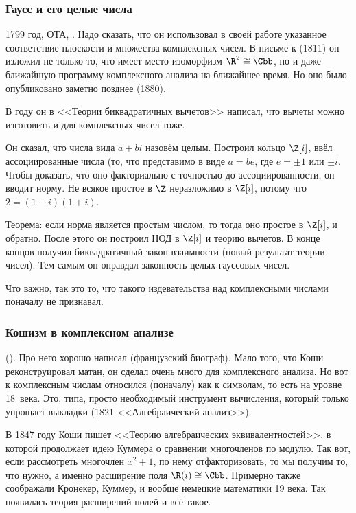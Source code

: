 \documentclass[a4paper,oneside,fleqn,10pt]{article}
\begin{document}
\subsubsection{Гаусс и его целые числа}

1799 год, ОТА, . Надо сказать, что он использовал в своей работе
указанное соответствие плоскости и множества комплексных чисел.
В письме к  (1811) он изложил не только то, что имеет
место изоморфизм $\R^2 \cong \Cbb$, но и даже ближайшую программу комплексного анализа
на ближайшее время. Но оно было опубликовано заметно позднее (1880).

В  году он в <<Теории биквадратичных вычетов>> написал, что вычеты
можно изготовить и для комплексных чисел тоже.

Он сказал, что числа вида $a+ bi$ назовём целым. Построил кольцо $\Z[i]$,
ввёл ассоциированные числа (то, что представимо в виде $a = be$, где $e = \pm1$ или $\pm i$.
Чтобы доказать, что оно факториально с точностью до ассоциированности, он вводит норму.
Не всякое простое в $\Z$ неразложимо в $\Z[i]$, потому что $2 = (1-i)(1+i)$.

Теорема: если норма является простым числом, то тогда оно простое в $\Z[i]$, и обратно.
После этого он построил НОД в $\Z[i]$ и теорию вычетов. В конце концов получил
биквадратичный закон взаимности (новый результат теории чисел).
Тем самым он оправдал законность целых гауссовых чисел.

Что важно, так это то, что  такого издевательства над комплексными
числами поначалу не признавал.

\subsubsection{Кошизм в комплексном анализе}

 ().
Про него  хорошо написал  (французский биограф).
Мало того, что Коши реконструировал матан, он сделал очень много
для комплексного анализа. Но вот к комплексным числам
относился (поначалу) как к символам, то есть на уровне 18~века.
Это, типа, просто необходимый инструмент вычисления, который только упрощает
выкладки (1821 <<Алгебраический анализ>>).

В 1847 году Коши пишет <<Теорию алгебраических эквивалентностей>>, в которой
продолжает идею Куммера о сравнении многочленов по модулю.
Так вот, если рассмотреть многочлен $x^2+1$, по нему отфакторизовать, то мы получим
то, что нужно, а именно расширение поля $\R(i) \cong \Cbb$.
Примерно также соображали Кронекер, Куммер, и вообще немецкие математики
19 века. Так появилась теория расширений полей и всё такое.
\end{document}
